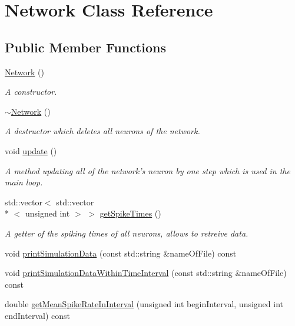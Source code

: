 \hypertarget{classNetwork}{\section{Network Class Reference}
\label{classNetwork}
}
\subsection*{Public Member Functions}
\begin{DoxyCompactItemize}
\item 
\hyperlink{classNetwork_a3cc2fb4f8fa4d507077e8da85ce5a1c8}{Network} ()
\begin{DoxyCompactList}\small\item\em A constructor. \end{DoxyCompactList}\item 
\hypertarget{classNetwork_a7a4e19cdb4bf0c7ecf82baa643831492}{\hyperlink{classNetwork_a7a4e19cdb4bf0c7ecf82baa643831492}{$\sim$\-Network} ()}\label{classNetwork_a7a4e19cdb4bf0c7ecf82baa643831492}

\begin{DoxyCompactList}\small\item\em A destructor which deletes all neurons of the network. \end{DoxyCompactList}\item 
\hypertarget{classNetwork_ab07bb6f6d9020b9eb230551083ea929f}{void \hyperlink{classNetwork_ab07bb6f6d9020b9eb230551083ea929f}{update} ()}\label{classNetwork_ab07bb6f6d9020b9eb230551083ea929f}

\begin{DoxyCompactList}\small\item\em A method updating all of the network's neuron by one step which is used in the main loop. \end{DoxyCompactList}\item 
\hypertarget{classNetwork_a618d267c0962f59027c0d063aa2b4533}{std\-::vector$<$ std\-::vector\\*
$<$ unsigned int $>$ $>$ \hyperlink{classNetwork_a618d267c0962f59027c0d063aa2b4533}{get\-Spike\-Times} ()}\label{classNetwork_a618d267c0962f59027c0d063aa2b4533}

\begin{DoxyCompactList}\small\item\em A getter of the spiking times of all neurons, allows to retreive data. \end{DoxyCompactList}\item 
void \hyperlink{classNetwork_a222e084554183af355833cda07a83877}{print\-Simulation\-Data} (const std\-::string \&name\-Of\-File) const 
\item 
void \hyperlink{classNetwork_a8909c07d0e6e292f5ca54e56a797ebe0}{print\-Simulation\-Data\-Within\-Time\-Interval} (const std\-::string \&name\-Of\-File) const 
\item 
double \hyperlink{classNetwork_ac82435bb56bf5eabfdd3e3f4afadea2b}{get\-Mean\-Spike\-Rate\-In\-Interval} (unsigned int begin\-Interval, unsigned int end\-Interval) const 
\end{DoxyCompactItemize}


